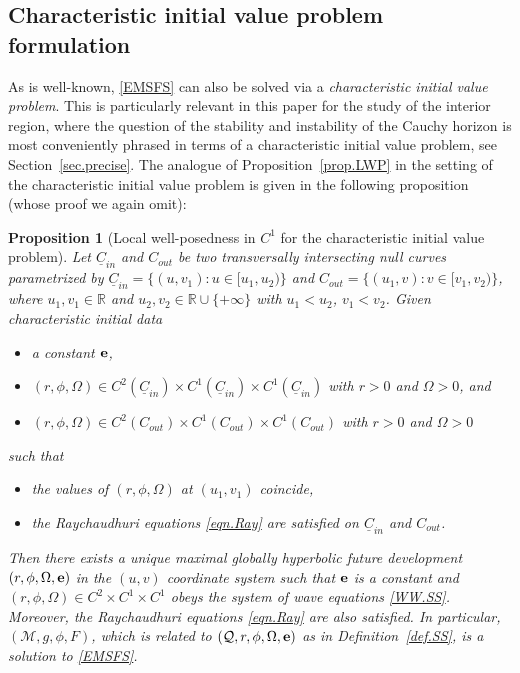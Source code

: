 \documentclass[10pt, reqno]{amsart}
\newtheorem{proposition}[theorem]{Proposition}
\theoremstyle{definition}
\theoremstyle{remark}
\numberwithin{equation}{section}
\newcommand{\0}{\emptyset}
\newcommand{\Omg}{\Omega}
\newcommand{\bfe}{{\bf e}}
\newcommand{\uC}{\underline{C}}
\newcommand{\e}{\bfe}							%
\begin{document}
\subsection{Characteristic initial value problem formulation}

As is well-known, \eqref{EMSFS} can also be solved via a \emph{characteristic initial value problem}. This is particularly relevant in this paper for the study of the interior region, where the question of the stability and instability of the Cauchy horizon is most conveniently phrased in terms of a characteristic initial value problem, see Section~\ref{sec.precise}. The analogue of Proposition~\ref{prop.LWP} in the setting of the characteristic initial value problem is given in the following proposition (whose proof we again omit):
 
\begin{proposition}[Local well-posedness in $C^1$ for the characteristic initial value problem]\label{prop.CIVP.LWP}
Let $\uC_{in}$ and $C_{out}$ be two transversally intersecting null curves parametrized by $\uC_{in}=\{(u, v_1): u\in [u_1, u_2 )\}$ and $C_{out}=\{(u_1, v): v\in [v_1, v_2 )\}$, where $u_1, v_1\in \mathbb R$ and $u_2, v_2\in \mathbb R\cup\{+\infty\}$ with $u_1<u_2$, $v_1<v_2$. Given \emph{characteristic initial data}
\begin{itemize}
\item a constant $\e$,
\item $(r,\phi,\Omg)\in C^2(\uC_{in})\times C^1(\uC_{in})\times C^1(\uC_{in})$ with $r>0$ and $\Omg>0$, and
\item $(r,\phi,\Omg)\in C^2(C_{out})\times C^1(C_{out})\times C^1(C_{out})$ with $r>0$ and $\Omg>0$
\end{itemize}
such that
\begin{itemize}
\item the values of $(r,\phi,\Omg)$ at $(u_1, v_1)$ coincide,
\item the Raychaudhuri equations \eqref{eqn.Ray} are satisfied on $\uC_{in}$ and $C_{out}$.
\end{itemize}
Then there exists a unique maximal globally hyperbolic future development $(r,\phi,\Omg,\e)$ in the $(u,v)$ coordinate system such that $\e$ is a constant and $(r,\phi,\Omg)\in C^2\times C^1\times C^1$ obeys the system of wave equations \eqref{WW.SS}. Moreover, the Raychaudhuri equations \eqref{eqn.Ray} are also satisfied. In particular, $(\mathcal M, g, \phi, F)$, which is related to $(\mathcal Q, r, \phi, \Omg, \e)$ as in Definition~\ref{def.SS}, is a solution to \eqref{EMSFS}.
\end{proposition}
\end{document}

